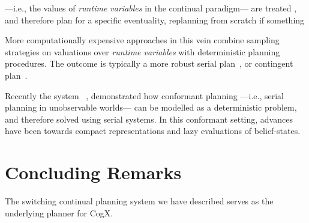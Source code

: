 \documentclass[letterpaper]{article}
\begin{document}
 ---i.e., the values of {\em
runtime variables} in the continual paradigm--- are treated , and
therefore plan for a specific eventuality, replanning from scratch if
something


More computationally expensive approaches in this vein combine
sampling strategies on valuations over {\em runtime variables} with
deterministic planning procedures. The outcome is typically a more
robust serial plan~\cite{yoon:etal:2008}, or contingent
plan~\cite{majercik:2006}.



Recently the system
~\cite{hoffmann:brafman:2006}, demonstrated how
conformant planning ---i.e., serial planning in unobservable worlds---
can be modelled as a deterministic problem, and therefore solved using
serial systems. In this conformant setting, advances have been towards
compact representations and lazy evaluations of belief-states.
 

\section{Concluding Remarks}

The switching continual planning system we have described serves as
the underlying planner for CogX. 




\end{document}
